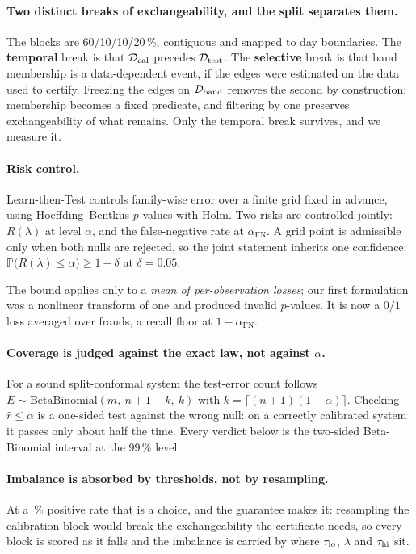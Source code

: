 \paragraph{Two distinct breaks of exchangeability, and the split separates them.} The blocks are
60/10/10/20\,\%, contiguous and snapped to day boundaries. The \textbf{temporal} break is that
$\mathcal{D}_{\mathrm{cal}}$ precedes $\mathcal{D}_{\mathrm{test}}$. The \textbf{selective} break is that band membership is a
data-dependent event, if the edges were estimated on the data used to certify. Freezing the
edges on $\mathcal{D}_{\mathrm{band}}$ removes the second by construction: membership becomes a fixed predicate, and
filtering by one preserves exchangeability of what remains. Only the temporal break survives,
and we measure it.

\paragraph{Risk control.} Learn-then-Test controls family-wise error over a finite grid fixed
in advance, using Hoeffding--Bentkus $p$-values with Holm. Two risks are controlled jointly:
$R(\lambda)$ at level $\alpha$, and the false-negative rate at $\alpha_{\mathrm{FN}}$. A grid
point is admissible only when both nulls are rejected, so the joint statement inherits one
confidence: $\mathbb{P}\bigl(R(\lambda) \le \alpha\bigr) \ge 1 - \delta$ at $\delta = 0.05$.

The bound applies only to a \emph{mean of per-observation losses}; our first formulation was a
nonlinear transform of one and produced invalid $p$-values. It is now a $0/1$ loss averaged over
frauds, a recall floor at $1 - \alpha_{\mathrm{FN}}$.

\paragraph{Coverage is judged against the exact law, not against $\alpha$.} For a sound
split-conformal system the test-error count follows
$E \sim \mathrm{BetaBinomial}(m,\ n{+}1{-}k,\ k)$ with $k = \lceil (n{+}1)(1-\alpha) \rceil$.
Checking $\hat r \le \alpha$ is a one-sided test against the wrong null: on a correctly
calibrated system it passes only about half the time. Every verdict below is the two-sided
Beta-Binomial interval at the 99\,\% level.

\paragraph{Imbalance is absorbed by thresholds, not by resampling.} At a
\ClaimTestFraudRate\,\% positive rate that is a choice, and the guarantee makes it: resampling
the calibration block would break the exchangeability the certificate needs, so every block is
scored as it falls and the imbalance is carried by where $\tau_{\mathrm{lo}}$, $\lambda$ and $\tau_{\mathrm{hi}}$ sit.

